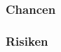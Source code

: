 \begin{comment}
\subsubsection{Organisationsstruktur}
Da der Kunde des ISV keine Serverinfrastruktur betreiben muss, um die 
Cloud-Lösung zu nutzen und auch auf den Rechnern der Endbenutzer nichts 
installiert werden muss, entfallen im Idealfall Verhandlungen zwischen ISV und 
der IT-Abteilung des Kunden; Entscheidungen werden in kleineren Kreisen, direkt 
von Fachabteilungen getroffen. Für den ISV hat dies zur Folge, dass er mit 

Als Abstraktionsschicht ermöglicht es Cloud-Computing Unternehmen die 
Wertschöpfungskette zu verschlanken und sich auf ihr Kerngeschäft zu 
konzentrieren.

Cloud-Computing wird im Ideal als Abstraktionsschicht gesehen, die 
Komplexitäten 
vor Fachabteilungen und Führungskräften verbirgt und es ihnen ermöglicht ohne 
Entwickler. Wo in der Vergangenheit Empfehlungen, Design, Entwicklung, 
Deployment und Wartung in den Händen von IT-Abteilungen lagen, ist es im 
Cloud-Computing nötig, dass Führungskräfte

Auf dem Weg zum einzigartigen, innovativen und wettbewerbsfähigen Produkt, muss 
sich ein Unternehmen auf seine Kernkompetenzen konzentrieren und 
das Thema IT neu betrachten, um die Flexibilität und Agilität der Cloud nutzen 
zu können. Anstatt sich in der Hauptsache die bestehende 
IT-Infrastruktur zu unterhalten, werden IT-Abteilungen zu strategischen 
Partnern 
in der Weiterentwicklung der Produkte 
\pcite{}{}{how_saas_changes_an_isvs_business}: Mitarbeiter aus der IT müssen 
genutzt werden, um qualitativ hochwertige, nutzbare 
Trends bei Cloud-Dienstleistungen frühzeitig zu erkennen und kreativ in das 
Produkt einfließen zu lassen oder Business-Prozesse bestmöglich zu 
unterstützen.
\end{comment}


\subsubsection{Chancen}




\subsubsection{Risiken}






